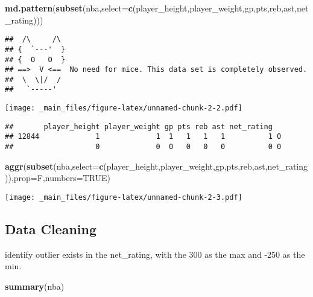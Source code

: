 \documentclass[
]{book}
\newenvironment{Shaded}{\begin{snugshade}}{\end{snugshade}}
\newcommand{\AttributeTok}[1]{\textcolor[rgb]{0.13,0.29,0.53}{#1}}
\newcommand{\ConstantTok}[1]{\textcolor[rgb]{0.56,0.35,0.01}{#1}}
\newcommand{\FunctionTok}[1]{\textcolor[rgb]{0.13,0.29,0.53}{\textbf{#1}}}
\newcommand{\NormalTok}[1]{#1}
\theoremstyle{definition}
\theoremstyle{definition}
\theoremstyle{definition}
\theoremstyle{definition}
\theoremstyle{remark}
\begin{document}
\begin{Shaded}
\begin{Highlighting}[]
\FunctionTok{md.pattern}\NormalTok{(}\FunctionTok{subset}\NormalTok{(nba,}\AttributeTok{select=}\FunctionTok{c}\NormalTok{(player\_height,player\_weight,gp,pts,reb,ast,net\_rating)))}
\end{Highlighting}
\end{Shaded}

\begin{verbatim}
##  /\     /\
## {  `---'  }
## {  O   O  }
## ==>  V <==  No need for mice. This data set is completely observed.
##  \  \|/  /
##   `-----'
\end{verbatim}

\texttt{[image: \_main\_files/figure-latex/unnamed-chunk-2-2.pdf]}

\begin{verbatim}
##       player_height player_weight gp pts reb ast net_rating  
## 12844             1             1  1   1   1   1          1 0
##                   0             0  0   0   0   0          0 0
\end{verbatim}

\begin{Shaded}
\begin{Highlighting}[]
\FunctionTok{aggr}\NormalTok{(}\FunctionTok{subset}\NormalTok{(nba,}\AttributeTok{select=}\FunctionTok{c}\NormalTok{(player\_height,player\_weight,gp,pts,reb,ast,net\_rating)),}\AttributeTok{prop=}\NormalTok{F,}\AttributeTok{numbers=}\ConstantTok{TRUE}\NormalTok{)}
\end{Highlighting}
\end{Shaded}

\texttt{[image: \_main\_files/figure-latex/unnamed-chunk-2-3.pdf]}

\hypertarget{data-cleaning}{%
\subsection{Data Cleaning}\label{data-cleaning}}

identify outlier exists in the net\_rating, with the 300 as the max and -250 as the min.

\begin{Shaded}
\begin{Highlighting}[]
\FunctionTok{summary}\NormalTok{(nba)}
\end{Highlighting}
\end{Shaded}
\end{document}
